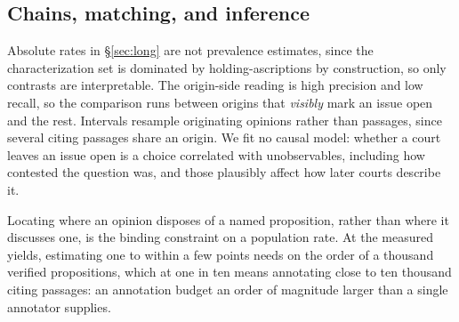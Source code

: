 \subsection{Chains, matching, and inference}
Absolute rates in \S\ref{sec:long} are not prevalence estimates, since the
characterization set is dominated by holding-ascriptions by construction, so only
contrasts are interpretable. The origin-side reading is high precision and low
recall, so the comparison runs between origins that \emph{visibly} mark an issue
open and the rest. Intervals resample originating opinions rather than passages,
since several citing passages share an origin. We fit no causal model: whether a
court leaves an issue open is a choice correlated with unobservables, including
how contested the question was, and those plausibly affect how later courts
describe it.

Locating where an opinion disposes of a named proposition, rather than where it
discusses one, is the binding constraint on a population rate. At the measured
yields, estimating one to within a few points needs on the order of a thousand
verified propositions, which at one in ten means annotating close to ten thousand
citing passages: an annotation budget an order of magnitude larger than a single
annotator supplies.
